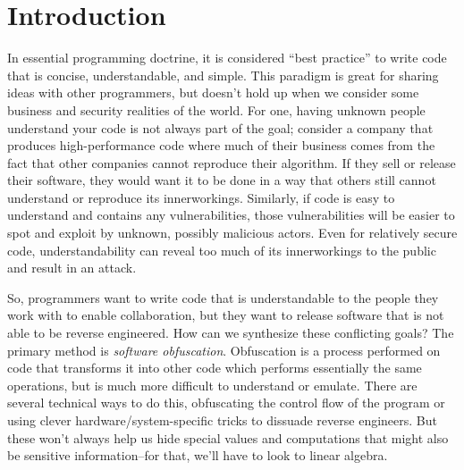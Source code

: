 \section{Introduction}
In essential programming doctrine, it is considered ``best practice'' to write code that
is concise, understandable, and simple. This paradigm is great for sharing ideas
with other programmers, but doesn't hold up when we consider some business and 
security realities of the world. For one, having unknown people understand
your code is not always part of the goal; consider a company that produces 
high-performance code where much of their business comes from the fact that 
other companies cannot reproduce their algorithm. If they sell or
release their software, they would want it to be done in a way that others still
cannot understand or reproduce its innerworkings.
Similarly, if code is easy to understand and contains any vulnerabilities, 
those vulnerabilities will be easier to spot and exploit by unknown, possibly
malicious actors. Even for relatively secure code, understandability can reveal
too much of its innerworkings to the public and result in an attack.
\par So, programmers want to write code that is understandable to the people 
they work with to enable collaboration, but they want to release software that is not
able to be reverse engineered. How can we synthesize 
these conflicting goals? The primary method is {\itshape software obfuscation}.
Obfuscation is a process performed on code that transforms it into other code
which performs essentially the same operations, but is much more difficult to 
understand or emulate. There are several technical ways to do this, obfuscating
the control flow of the program or using clever hardware/system-specific tricks
to dissuade reverse engineers. But these won't always help us hide special values
and computations that might also be sensitive information--for that, we'll have to 
look to linear algebra.
